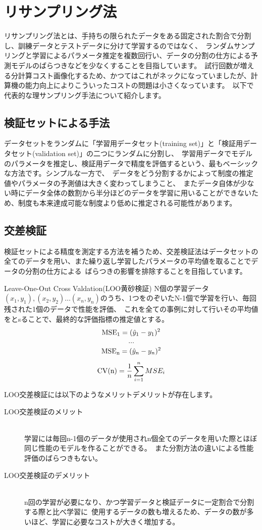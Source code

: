 \documentclass[uplatex]{jsarticle}
\begin{document}
\section{リサンプリング法}
リサンプリング法とは、手持ちの限られたデータをある固定された割合で分割し、訓練データとテストデータに分けて学習するのではなく、\
ランダムサンプリングと学習によるパラメータ推定を複数回行い、データの分割の仕方による予測モデルのばらつきなどを少なくすることを目指しています。\
試行回数が増える分計算コスト画像化するため、かつてはこれがネックになっていましたが、計算機の能力向上によりこういったコストの問題は小さくなっています。\
以下で代表的な理サンプリング手法について紹介します。
\subsection{検証セットによる手法}
データセットをランダムに「学習用データセット(training set)」と「検証用データセット(validation set)」の二つにランダムに分割し、\
学習用データでモデルのパラメータを推定し、検証用データで精度を評価するという、最もベーシックな方法です。シンプルな一方で、\
データをどう分割するかによって制度の推定値やパラメータの予測値は大きく変わってしまうこと、\
またデータ自体が少ない時にデータ全体の数割から半分ほどのデータを学習に用いることができないため、制度も本来達成可能な制度より低めに推定される可能性があります。

\subsection{交差検証}
検証セットによる精度を測定する方法を補うため、交差検証法はデータセットの全てのデータを用い、また繰り返し学習したパラメータの平均値を取ることでデータの分割の仕方による\
ばらつきの影響を排除することを目指しています。
\begin{itembox}[l]{Leave-One-Out Cross Valdation(LOO黄砂検証)}
  N個の学習データ${(x_1, y_1), (x_2, y_2) \ldots (x_n, y_n)}$のうち、1つをのぞいたN-1個で学習を行い、毎回残された1個のデータで性能を評価、\
  これを全ての事例に対して行いその平均値をとsることで、最終的な評価指標の推定値とする。\\
  $$ {\rm MSE_1} = (\hat{y}_1-y_1)^2$$
  $$\dots$$
  $$ {\rm MSE_n} = (\hat{y}_n-y_n)^2$$
  $$ {\rm CV(n)} = \frac{1}{n}\sum_{i=1}^n MSE_i$$
\end{itembox}
LOO交差検証には以下のようなメリットデメリットが存在します。
  \begin{description}
    \item [LOO交差検証のメリット]\mbox{}\\
    学習には毎回n-1個のデータが使用されn個全てのデータを用いた際とほぼ同じ性能のモデルを作ることができる。\
    また分割方法の違いによる性能評価のばらつきもない。
    \item [LOO交差検証のデメリット]\mbox{}\\
    n回の学習が必要になり、かつ学習データと検証データに一定割合で分割する際と比べ学習に\
    使用するデータの数も増えるため、データの数が多いほど、学習に必要なコストが大きく増加する。
  \end{description}
\end{document}

